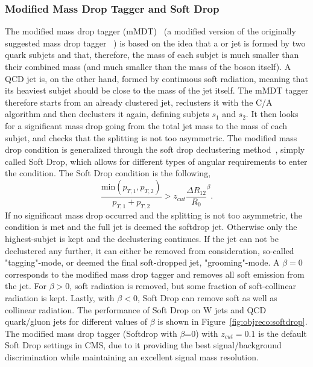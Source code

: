 \subsubsection{Modified Mass Drop Tagger and Soft Drop}
\label{sec:objreco:softdrop}
The modified mass drop tagger (mMDT)~\cite{Dasgupta:2013ihk} (a modified version of the originally suggested mass drop tagger ~\cite{Butterworth:2008iy}) is based on the idea that a \PW or \PZ jet is formed by two quark subjets and that, therefore, the mass of each subjet is much smaller than their combined mass (and much smaller than the mass of the boson itself). A QCD jet is, on the other hand, formed by continuous soft radiation, meaning that its heaviest subjet should be close to the mass of the jet itself. The mMDT tagger therefore starts from an already clustered jet, reclusters it with the C/A algorithm and then declusters it again, defining subjets $s_1$ and $s_2$. It then looks for a significant mass drop going from the total jet mass to the mass of each subjet, and checks that the splitting is not too asymmetric. The modified mass drop condition is generalized through the soft drop declustering method~\cite{Larkoski:2014wba}, simply called Soft Drop, which allows for different types of angular requirements to enter the condition. The Soft Drop condition is the following,
\begin{equation*}
\frac{ \textrm{min}(p_{T,1},p_{T,2}) }{ p_{T,1}+p_{T,2} } > z_{cut} \frac{\Delta R_{12}}{R_0}^\beta.
\end{equation*}
If no significant mass drop occurred and the splitting is not too asymmetric, the condition is met and the full jet is deemed the softdrop jet. Otherwise only the highest-\PT subjet is kept and the declustering continues. If the jet can not be declustered any further, it can either be removed from consideration, so-called "tagging"-mode, or deemed the final soft-dropped jet, "grooming"-mode. A $\beta=0$ corresponds to the modified mass drop tagger and removes all soft emission from the jet. For $\beta>0$, soft radiation is removed, but some fraction of soft-collinear radiation is kept. Lastly, with $\beta<0$, Soft Drop can remove soft as well as collinear radiation.
The performance of Soft Drop on W jets and QCD quark/gluon jets for different values of $\beta$ is shown in Figure~\ref{fig:objreco:softdrop}. The modified mass drop tagger (Softdrop with $\beta$=0) with $z_{cut} = 0.1$ is the default Soft Drop settings in CMS, due to it providing the best signal/background discrimination while maintaining an excellent signal mass resolution. 
